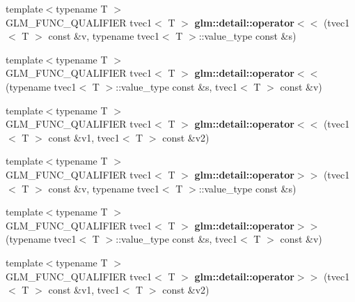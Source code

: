 \begin{DoxyCompactItemize}
\item 
\hypertarget{namespaceglm_1_1detail_a1b2401f17739acc84c535021545748b5}{{\footnotesize template$<$typename T $>$ }\\\-G\-L\-M\-\_\-\-F\-U\-N\-C\-\_\-\-Q\-U\-A\-L\-I\-F\-I\-E\-R tvec1$<$ \-T $>$ {\bfseries glm\-::detail\-::operator$<$$<$} (tvec1$<$ \-T $>$ const \&v, typename tvec1$<$ \-T $>$\-::value\-\_\-type const \&s)}\label{namespaceglm_1_1detail_a1b2401f17739acc84c535021545748b5}

\item 
\hypertarget{namespaceglm_1_1detail_a9160216c3c05c934418e4682a8cf71dc}{{\footnotesize template$<$typename T $>$ }\\\-G\-L\-M\-\_\-\-F\-U\-N\-C\-\_\-\-Q\-U\-A\-L\-I\-F\-I\-E\-R tvec1$<$ \-T $>$ {\bfseries glm\-::detail\-::operator$<$$<$} (typename tvec1$<$ \-T $>$\-::value\-\_\-type const \&s, tvec1$<$ \-T $>$ const \&v)}\label{namespaceglm_1_1detail_a9160216c3c05c934418e4682a8cf71dc}

\item 
\hypertarget{namespaceglm_1_1detail_a795144a1721352dd8ec35087e0cb9ff4}{{\footnotesize template$<$typename T $>$ }\\\-G\-L\-M\-\_\-\-F\-U\-N\-C\-\_\-\-Q\-U\-A\-L\-I\-F\-I\-E\-R tvec1$<$ \-T $>$ {\bfseries glm\-::detail\-::operator$<$$<$} (tvec1$<$ \-T $>$ const \&v1, tvec1$<$ \-T $>$ const \&v2)}\label{namespaceglm_1_1detail_a795144a1721352dd8ec35087e0cb9ff4}

\item 
\hypertarget{namespaceglm_1_1detail_ad6c1e015a661e377bbc6dd97543d44fe}{{\footnotesize template$<$typename T $>$ }\\\-G\-L\-M\-\_\-\-F\-U\-N\-C\-\_\-\-Q\-U\-A\-L\-I\-F\-I\-E\-R tvec1$<$ \-T $>$ {\bfseries glm\-::detail\-::operator$>$$>$} (tvec1$<$ \-T $>$ const \&v, typename tvec1$<$ \-T $>$\-::value\-\_\-type const \&s)}\label{namespaceglm_1_1detail_ad6c1e015a661e377bbc6dd97543d44fe}

\item 
\hypertarget{namespaceglm_1_1detail_abe562021ea02757230c507dcec64e280}{{\footnotesize template$<$typename T $>$ }\\\-G\-L\-M\-\_\-\-F\-U\-N\-C\-\_\-\-Q\-U\-A\-L\-I\-F\-I\-E\-R tvec1$<$ \-T $>$ {\bfseries glm\-::detail\-::operator$>$$>$} (typename tvec1$<$ \-T $>$\-::value\-\_\-type const \&s, tvec1$<$ \-T $>$ const \&v)}\label{namespaceglm_1_1detail_abe562021ea02757230c507dcec64e280}

\item 
\hypertarget{namespaceglm_1_1detail_ac0a8c77debb2d3be29d2f966a35b8f29}{{\footnotesize template$<$typename T $>$ }\\\-G\-L\-M\-\_\-\-F\-U\-N\-C\-\_\-\-Q\-U\-A\-L\-I\-F\-I\-E\-R tvec1$<$ \-T $>$ {\bfseries glm\-::detail\-::operator$>$$>$} (tvec1$<$ \-T $>$ const \&v1, tvec1$<$ \-T $>$ const \&v2)}\label{namespaceglm_1_1detail_ac0a8c77debb2d3be29d2f966a35b8f29}


\end{DoxyCompactItemize}
